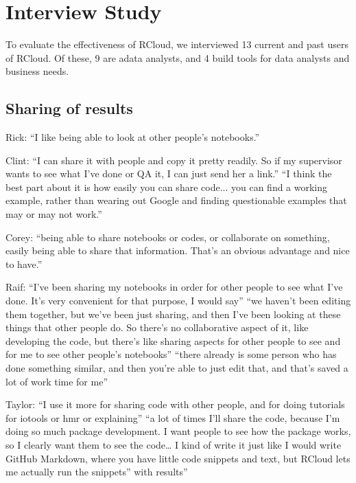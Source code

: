 \section{Interview Study\label{sec:interviews}}

To evaluate the effectiveness of RCloud, we interviewed 13 current and past users of RCloud. Of these, 9 are adata analysts, and 4 build tools for data analysts and business needs.



\subsection{Sharing of results}
Rick: ``I like being able to look at other people's notebooks.''

Clint: ``I can share it with people and copy it pretty readily. So if my supervisor wants to see what I've done or QA it, I can just send her a link.'' ``I think the best part about it is how easily you can share code... you can find a working example, rather than wearing out Google and finding questionable examples that may or may not work.''

Corey: ``being able to share notebooks or codes, or collaborate on something, easily being able to share that information. That's an obvious advantage and nice to have.''

Raif: ``I've been sharing my notebooks in order for other people to see what I've done. It's very convenient for that purpose, I would say'' ``we haven't been editing them together, but we've been just sharing, and then I've been looking at these things that other people do. So there's no collaborative aspect of it, like developing the code, but there's like sharing aspects for other people to see and for me to see other people's notebooks'' ``there already is some person who has done something similar, and then you're able to just edit that, and that's saved a lot of work time for me''

Taylor: ``I use it more for sharing code with other people, and for doing tutorials for iotools or hmr or explaining'' ``a lot of times I'll share the code, because I'm doing so much package development. I want people to see how the package works, so I clearly want them to see the code… I kind of write it just like I would write GitHub Markdown, where you have little code snippets and text, but RCloud lets me actually run the snippets” with results''


